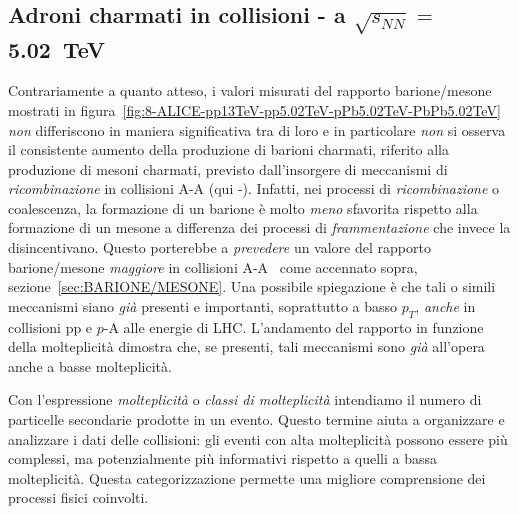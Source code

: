     \subsection{Adroni charmati in collisioni - a $\sqrt{s_{NN}} =$ \qty{5.02}{\tera \eV}}
        Contrariamente a quanto atteso, i valori misurati del rapporto barione/mesone mostrati in figura~\ref{fig:8-ALICE-pp13TeV-pp5.02TeV-pPb5.02TeV-PbPb5.02TeV} \textit{non} differiscono in maniera significativa tra di loro e in particolare \textit{non} si osserva il consistente aumento della produzione di barioni charmati, riferito alla produzione di mesoni charmati, previsto dall'insorgere di meccanismi di \textit{ricombinazione} in collisioni A-A (qui -). Infatti, nei processi di \textit{ricombinazione} o coalescenza, la formazione di un barione è molto \textit{meno} sfavorita rispetto alla formazione di un mesone a differenza dei processi di \textit{frammentazione} che invece la disincentivano. Questo porterebbe a \textit{prevedere} un valore del rapporto barione/mesone \textit{maggiore} in collisioni A-A~\cite{Strazzi_2019} come accennato sopra, sezione~\ref{sec:BARIONE/MESONE}. Una possibile spiegazione è che tali o simili meccanismi siano \textit{già} presenti e importanti, soprattutto a basso $p_T$, \textit{anche} in collisioni pp e $p$-A alle energie di LHC. L'andamento del rapporto in funzione della molteplicità dimostra che, se presenti, tali meccanismi sono \textit{già} all’opera anche a basse molteplicità.

        Con l'espressione \textit{molteplicità} o \textit{classi di molteplicità} intendiamo il numero di particelle secondarie prodotte in un evento. Questo termine aiuta a organizzare e analizzare i dati delle collisioni: gli eventi con alta molteplicità possono essere più complessi, ma potenzialmente più informativi rispetto a quelli a bassa molteplicità. Questa categorizzazione permette una migliore comprensione dei processi fisici coinvolti.

\newpage
        
